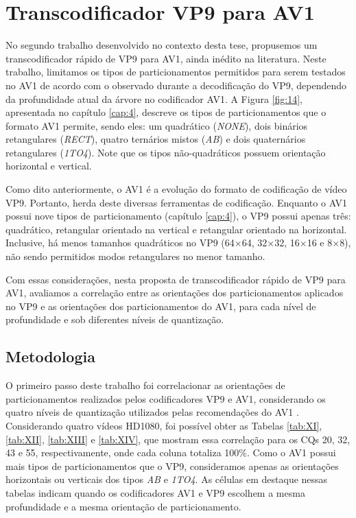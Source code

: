 \section{Transcodificador VP9 para AV1}
\label{cap:6.2}

No segundo trabalho desenvolvido no contexto desta tese, propusemos um transcodificador rápido de VP9 para AV1, ainda inédito na literatura. Neste trabalho, limitamos os tipos de particionamentos permitidos para serem testados no AV1 de acordo com o observado durante a decodificação do VP9, dependendo da profundidade atual da árvore no codificador AV1. A Figura \ref{fig:14}, apresentada no capítulo \ref{cap:4}, descreve os tipos de particionamentos que o formato AV1 permite, sendo eles: um quadrático (\textit{NONE}), dois binários retangulares (\textit{RECT}), quatro ternários mistos (\textit{AB}) e dois quaternários retangulares (\textit{1TO4}). Note que os tipos não-quadráticos possuem orientação horizontal e vertical. 

Como dito anteriormente, o AV1 é a evolução do formato de codificação de vídeo VP9. Portanto, herda deste diversas ferramentas de codificação. Enquanto o AV1 possui nove tipos de particionamento (capítulo \ref{cap:4}), o VP9 possui apenas três: quadrático, retangular orientado na vertical e retangular orientado na horizontal. Inclusive, há menos tamanhos quadráticos no VP9 (64$\times$64, 32$\times$32, 16$\times$16 e 8$\times$8), não sendo permitidos modos retangulares no menor tamanho. 

Com essas considerações, nesta proposta de transcodificador rápido de VP9 para AV1, avaliamos a correlação entre as orientações dos particionamentos aplicados no VP9 e as orientações dos particionamentos do AV1, para cada nível de profundidade e sob diferentes níveis de quantização.

\subsection{Metodologia}
\label{cap:6.2.1}

O primeiro passo deste trabalho foi correlacionar as orientações de particionamentos realizados pelos codificadores VP9 e AV1, considerando os quatro níveis de quantização utilizados pelas recomendações do AV1 \citet{bib:ietfnetvct}. Considerando quatro vídeos HD1080, foi possível obter as Tabelas \ref{tab:XI}, \ref{tab:XII}, \ref{tab:XIII} e \ref{tab:XIV}, que mostram essa correlação para os CQs 20, 32, 43 e 55, respectivamente, onde cada coluna totaliza 100\%. Como o AV1 possui mais tipos de particionamentos que o VP9, consideramos apenas as orientações horizontais ou verticais dos tipos \textit{AB} e \textit{1TO4}. As células em destaque nessas tabelas indicam quando os codificadores AV1 e VP9 escolhem a mesma profundidade e a mesma orientação de particionamento.

